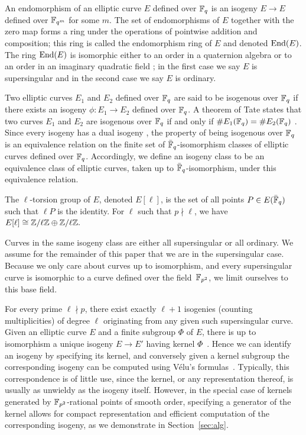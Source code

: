 An endomorphism of an elliptic curve $E$ defined over ${\mathbb{F}}_q$ is an
isogeny $E \rightarrow E$ defined over ${\mathbb{F}}_{q^m}$ for some $m$. The
set of endomorphisms of $E$ together with the zero map forms a ring
under the operations of pointwise addition and composition; this ring
is called the endomorphism ring of $E$ and denoted $\operatorname{End}(E)$. The ring
$\operatorname{End}(E)$ is isomorphic either to an order in a quaternion algebra or
to an order in an imaginary quadratic field \cite[V.3.1]{Sil}; in the
first case we say $E$ is supersingular and in the second case we say
$E$ is ordinary.

Two elliptic curves $E_1$ and $E_2$ defined over ${\mathbb{F}}_q$ are said to
be isogenous over ${\mathbb{F}}_q$ if there exists an isogeny $\phi\colon E_1
\to E_2$ defined over ${\mathbb{F}}_q$. A theorem of Tate states that
two curves $E_1$ and $E_2$ are isogenous over ${\mathbb{F}}_q$ if and only if
$\#E_1({\mathbb{F}}_q) = \#E_2({\mathbb{F}}_q)$ \cite[$\S$3]{Tate}. Since every isogeny
has a dual isogeny \cite[III.6.1]{Sil}, the property of being
isogenous over ${\mathbb{F}}_q$ is an equivalence relation on the finite set of
$\bar{{\mathbb{F}}}_q$-isomorphism classes of elliptic curves defined over
${\mathbb{F}}_q$.  Accordingly, we define an isogeny class to be an equivalence
class of elliptic curves, taken up to $\bar{{\mathbb{F}}}_q$-isomorphism, under
this equivalence relation.

The $\ell$-torsion group of $E$, denoted $E[\ell]$, is the set of all
points $P \in E(\bar{{\mathbb{F}}}_q)$ such that $\ell P$ is the identity. For
$\ell$ such that $p\nmid \ell$, we have $E[\ell] \cong {\mathbb{Z}}/\ell{\mathbb{Z}} \oplus
{\mathbb{Z}}/\ell{\mathbb{Z}}.$

Curves in the same isogeny class are either all supersingular or all
ordinary. 
We assume for the remainder of this paper that
we are in the supersingular case. Because we only care about curves
up to isomorphism, and every supersingular curve is
isomorphic to a curve defined over the field~${\mathbb{F}}_{p^2}$, we limit
ourselves to this base field.

For every
prime $\ell \nmid p$, there exist exactly $\ell+1$ isogenies (counting
multiplicities) of degree $\ell$ originating from any given such
supersingular curve.
Given an elliptic curve $E$ and a finite subgroup $\Phi$ of $E$, there
is up to isomorphism a unique isogeny $E \to E'$ having kernel
$\Phi$~\cite[III.4.12]{Sil}. Hence we can identify an isogeny by
specifying its kernel, and conversely given a kernel subgroup the
corresponding isogeny can be computed using V\'elu's
formulas~\cite{Velu}. Typically, this correspondence is of little use,
since the kernel, or any representation thereof, is usually as
unwieldy as the isogeny itself. However, in the special case of
kernels generated by ${\mathbb{F}}_{p^2}$-rational points of smooth order,
specifying a generator of the kernel allows for compact representation
and efficient computation of the corresponding isogeny, as we
demonstrate in Section~\ref{sec:alg}.


